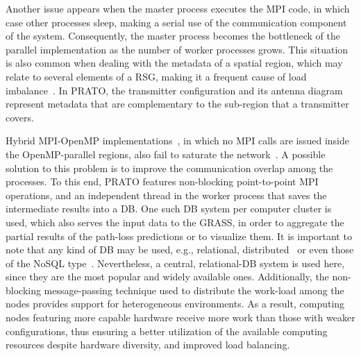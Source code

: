 Another issue appears when the master process executes the MPI code,
in which case other processes sleep, making a serial use of the communication
component of the system. Consequently, the master process becomes
the bottleneck of the parallel implementation as the number of worker
processes grows. This situation is also common when dealing with the
metadata of a spatial region, which may relate to several elements
of a RSG, making it a frequent cause of load imbalance~\cite{Gong_Parallel_agent_based_simulation_of_individual_level_spatial_interactions_within_a_multicore_computing_environment:2012,Hawick_Distributed_frameworks_and_parallel_algorithms_for_processing_large_scala_geographic_data:2003,Widener_Developing_a_parallel_computational_implementation_of_AMOEBA:2012}.
In PRATO, the transmitter configuration and its antenna diagram represent
metadata that are complementary to the sub-region that a transmitter
covers.

Hybrid MPI-OpenMP implementations~\cite{Tabik-High_performance_three_horizon_composition_algorithm_for_large_scale_terrains:2011,Tabik-Optimal_tilt_and_orientation_maps_a_multi_algorithm_approach_for_heterogeneous_multicore_GPU_systems:2013},
in which no MPI calls are issued inside the OpenMP-parallel regions,
also fail to saturate the network~\cite{Rabenseifner-Hybrid_MPI_OpenMP_parallel_programming_on_clusters_of_multicore_nodes:2009}.
A possible solution to this problem is to improve the communication
overlap among the processes. To this end, PRATO features non-blocking
point-to-point MPI operations, and an independent thread in the worker
process that saves the intermediate results into a DB. One such DB
system per computer cluster is used, which also serves the input data
to the GRASS, in order to aggregate the partial results of the path-loss
predictions or to visualize them. It is important to note that any
kind of DB may be used, e.g., relational, distributed~\cite{Ozsu_Principles_of_distributed_database_systems:2011}
or even those of the NoSQL type~\cite{Stonebraker_SQL_databases_vs_NoSQL_databases:2010}.
Nevertheless, a central, relational-DB system is used here, since
they are the most popular and widely available ones. Additionally,
the non-blocking message-passing technique used to distribute the
work-load among the nodes provides support for heterogeneous environments.
As a result, computing nodes featuring more capable hardware receive
more work than those with weaker configurations, thus ensuring a better
utilization of the available computing resources despite hardware
diversity, and improved load balancing.



